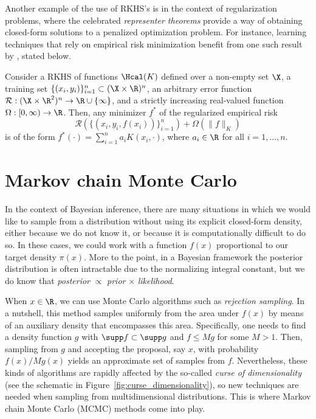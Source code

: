 Another example of the use of RKHS's is in the context of regularization problems, where the celebrated \textit{representer theorems} provide a way of obtaining closed-form solutions to a penalized optimization problem. For instance, learning techniques that rely on empirical risk minimization \citep[e.g.][]{vapnik1991principles} benefit from one such result by \citet{scholkopf2001generalized}, stated below.

\begin{theorem}
  Consider a RKHS of functions \(\Hcal(K)\) defined over a non-empty set \(\X\), a training set \(\{(x_i, y_i)\}_{i=1}^n \subset (\X \times \R)^n\), an arbitrary error function \(\mathcal R: (\X  \times \R^2)^n \to \R\cup\{\infty\}\), and a strictly increasing real-valued function \(\Omega:[0,\infty)\to \R\). Then, any minimizer \(f^\ast\) of the regularized empirical risk
  \[
    \mathcal R(\{(x_i, y_i, f(x_i))\}_{i=1}^n) + \Omega(\|f\|_K)
  \]
  is of the form \(f^\ast(\cdot) = \sum_{i=1}^n a_i K(x_i, \cdot)\), where \(a_i\in\R\) for all \(i=1,\dots,n\).
\end{theorem}

\section{Markov chain Monte Carlo}\label{sec:mcmc}

In the context of Bayesian inference, there are many situations in which we would like to sample from a distribution without using its explicit closed-form density, either because we do not know it, or because it is computationally difficult to do so. In these cases, we could work with a function \(f(x)\) proportional to our target density \(\pi(x)\). More to the point, in a Bayesian framework the posterior distribution is often intractable due to the normalizing integral constant, but we do know that \textit{posterior} \(\propto\) \textit{prior} \(\times\) \textit{likelihood}.

When \(x\in\R\), we can use Monte Carlo algorithms such as \textit{rejection sampling}. In a nutshell, this method samples uniformly from the area under \(f(x)\) by means of an auxiliary density that encompasses this area. Specifically, one needs to find a density function \(g\) with \(\supp f \subset \supp g\) and \(f \leq Mg\) for some \(M>1\). Then, sampling from \(g\) and accepting the proposal, say \(x\), with probability \(f(x)/Mg(x)\) yields an approximate set of samples from \(f\). Nevertheless, these kinds of algorithms are rapidly affected by the so-called \textit{curse of dimensionality} (see the schematic in Figure~\ref{fig:curse_dimensionality}), so new techniques are needed when sampling from multidimensional distributions. This is where Markov chain Monte Carlo (MCMC) methods come into play.

